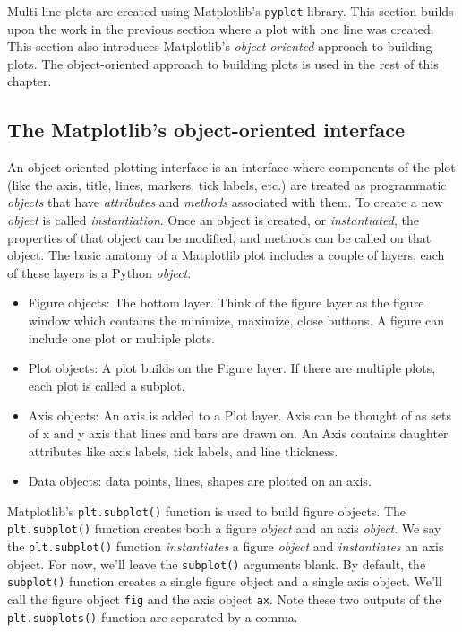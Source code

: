 \documentclass{book}
\providecommand{\tightlist}{%
      \setlength{\itemsep}{0pt}\setlength{\parskip}{0pt}}
\newcommand{\passthrough}[1]{#1}
\begin{document}
    
        Multi-line plots are created using Matplotlib's
\passthrough{\lstinline!pyplot!} library. This section builds upon the
work in the previous section where a plot with one line was created.
This section also introduces Matplotlib's \emph{object-oriented}
approach to building plots. The object-oriented approach to building
plots is used in the rest of this chapter.
    




    
        \hypertarget{the-matplotlibs-object-oriented-interface}{%
\subsection{The Matplotlib's object-oriented
interface}\label{the-matplotlibs-object-oriented-interface}}

An object-oriented plotting interface is an interface where components
of the plot (like the axis, title, lines, markers, tick labels, etc.)
are treated as programmatic \emph{objects} that have \emph{attributes}
and \emph{methods} associated with them. To create a new \emph{object}
is called \emph{instantiation}. Once an object is created, or
\emph{instantiated}, the properties of that object can be modified, and
methods can be called on that object. The basic anatomy of a Matplotlib
plot includes a couple of layers, each of these layers is a Python
\emph{object}:

\begin{itemize}
\tightlist
\item
  Figure objects: The bottom layer. Think of the figure layer as the
  figure window which contains the minimize, maximize, close buttons. A
  figure can include one plot or multiple plots.
\item
  Plot objects: A plot builds on the Figure layer. If there are multiple
  plots, each plot is called a subplot.
\item
  Axis objects: An axis is added to a Plot layer. Axis can be thought of
  as sets of x and y axis that lines and bars are drawn on. An Axis
  contains daughter attributes like axis labels, tick labels, and line
  thickness.
\item
  Data objects: data points, lines, shapes are plotted on an axis.
\end{itemize}
    




    
        Matplotlib's \passthrough{\lstinline!plt.subplot()!} function is used to
build figure objects. The \passthrough{\lstinline!plt.subplot()!}
function creates both a figure \emph{object} and an axis \emph{object}.
We say the \passthrough{\lstinline!plt.subplot()!} function
\emph{instantiates} a figure \emph{object} and \emph{instantiates} an
axis object. For now, we'll leave the
\passthrough{\lstinline!subplot()!} arguments blank. By default, the
\passthrough{\lstinline!subplot()!} function creates a single figure
object and a single axis object. We'll call the figure object
\passthrough{\lstinline!fig!} and the axis object
\passthrough{\lstinline!ax!}. Note these two outputs of the
\passthrough{\lstinline!plt.subplots()!} function are separated by a
comma.
\end{document}
